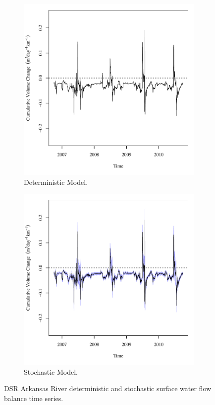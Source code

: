 \begin{linenumbers}
\begin{figure}[htbp]
\centering
	\begin{subfigure}{0.5\textwidth}
		\centering
		\includegraphics[width=0.9\linewidth]{"Figures/Results_DDSR/Balance Water - flow"}
		\caption{Deterministic Model.}
		\label{sub:DSRWaterFlowD}
	\end{subfigure}%
	\begin{subfigure}{0.5\textwidth}
		\centering
		\includegraphics[width=0.9\linewidth]{"Figures/Results_DSR/Balance Water - flow"}
		\caption{Stochastic Model.}
		\label{sub:DSRWaterFlowS}
	\end{subfigure}
		\caption[DSR Arkansas River deterministic and stochastic surface water flow balance time series.]{DSR Arkansas River deterministic and stochastic surface water flow balance time series.}
	\label{fig:DSRWaterFlow}
\end{figure}


\end{linenumbers}
